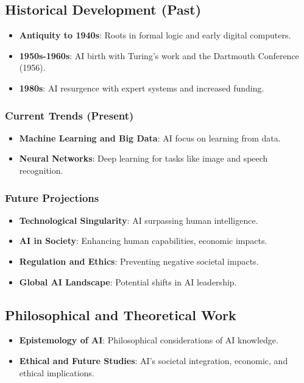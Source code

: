 \documentclass[10pt,titlepage]{book}
\begin{document}
\subsection{Historical Development (Past)}
\begin{itemize}
    \item \textbf{Antiquity to 1940s}: Roots in formal logic and early digital computers.
    \item \textbf{1950s-1960s}: AI birth with Turing's work and the Dartmouth Conference (1956).
    \item \textbf{1980s}: AI resurgence with expert systems and increased funding.
\end{itemize}

\subsubsection{Current Trends (Present)}
\begin{itemize}
    \item \textbf{Machine Learning and Big Data}: AI focus on learning from data.
    \item \textbf{Neural Networks}: Deep learning for tasks like image and speech recognition.
\end{itemize}

\subsubsection{Future Projections}
\begin{itemize}
    \item \textbf{Technological Singularity}: AI surpassing human intelligence.
    \item \textbf{AI in Society}: Enhancing human capabilities, economic impacts.
    \item \textbf{Regulation and Ethics}: Preventing negative societal impacts.
    \item \textbf{Global AI Landscape}: Potential shifts in AI leadership.
\end{itemize}

\subsection{Philosophical and Theoretical Work}

\begin{itemize}
    \item \textbf{Epistemology of AI}: Philosophical considerations of AI knowledge.
    \item \textbf{Ethical and Future Studies}: AI's societal integration, economic, and ethical implications.
\end{itemize}
\end{document}
